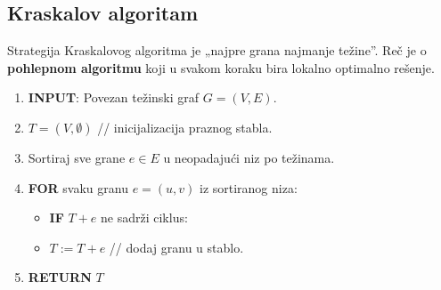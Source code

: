 \documentclass[a4paper,12pt]{article}
\numberwithin{algorithm}{section}
\theoremstyle{plain}
\theoremstyle{definition}
\theoremstyle{remark}
\begin{document}
\subsection{Kraskalov algoritam}
Strategija Kraskalovog algoritma je „najpre grana najmanje težine”. Reč je o \textbf{pohlepnom algoritmu} koji u svakom koraku bira lokalno optimalno rešenje.
\begin{algorithm}[ht]
    \caption{Kraskalov algoritam}
    \begin{enumerate}
        \item \textbf{INPUT}: Povezan težinski graf $G = (V, E)$.
        \item $T = (V, \emptyset)$ // inicijalizacija praznog stabla.
        \item Sortiraj sve grane $e \in E$ u neopadajući niz po težinama.
        \item \textbf{FOR} svaku granu $e = (u, v)$ iz sortiranog niza:
        \begin{itemize}
            \item \textbf{IF} $T + e$ ne sadrži ciklus:
            \item $T := T + e$ // dodaj granu u stablo.
        \end{itemize}
        \item \textbf{RETURN} $T$
    \end{enumerate}
\end{algorithm}
\end{document}
